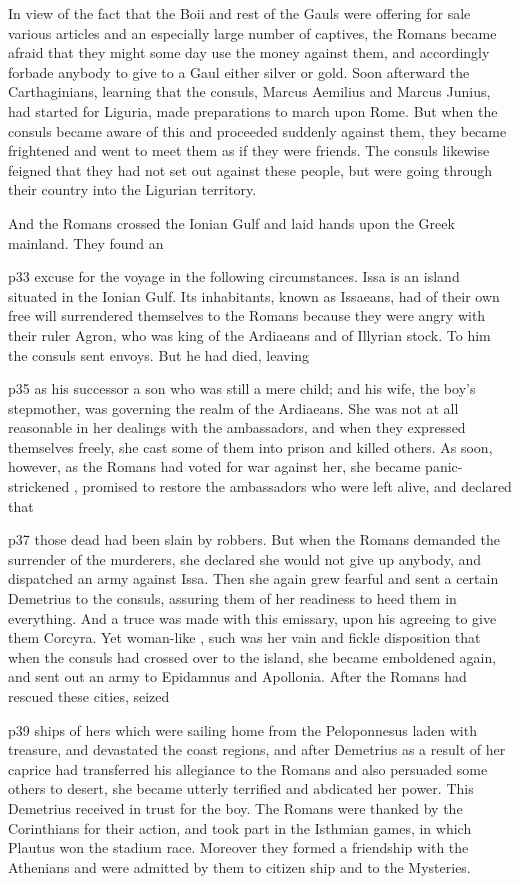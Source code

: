 In view of the fact that the Boii and rest of the Gauls were offering for sale various articles and an especially large number of captives, the Romans became afraid that they might some day use the money against them, and accordingly forbade anybody to give to a Gaul either silver or gold. Soon afterward the Carthaginians, learning that the consuls, Marcus Aemilius and Marcus Junius, had started for Liguria, made preparations to march upon Rome. But when the consuls became aware of this and proceeded suddenly against them, they became frightened and went to meet them as if they were friends. The consuls likewise feigned that they had not set out against these people, but were going through their country into the Ligurian territory.

And the Romans crossed the Ionian Gulf and laid hands upon the Greek mainland. They found an

p33 excuse for the voyage in the following circumstances. Issa is an island situated in the Ionian Gulf. Its inhabitants, known as Issaeans, had of their own free will surrendered themselves to the Romans because they were angry with their ruler Agron, who was king of the Ardiaeans and of Illyrian stock. To him the consuls sent envoys. But he had died, leaving

p35 as his successor a son who was still a mere child; and his wife, the boy's stepmother, was governing the realm of the Ardiaeans. She was not at all reasonable in her dealings with the ambassadors, and when they expressed themselves freely, she cast some of them into prison and killed others. As soon, however, as the Romans had voted for war against her, she became panic-strickened , promised to restore the ambassadors who were left alive, and declared that

p37 those dead had been slain by robbers. But when the Romans demanded the surrender of the murderers, she declared she would not give up anybody, and dispatched an army against Issa. Then she again grew fearful and sent a certain Demetrius to the consuls, assuring them of her readiness to heed them in everything. And a truce was made with this emissary, upon his agreeing to give them Corcyra. Yet woman-like , such was her vain and fickle disposition that when the consuls had crossed over to the island, she became emboldened again, and sent out an army to Epidamnus and Apollonia. After the Romans had rescued these cities, seized

p39 ships of hers which were sailing home from the Peloponnesus laden with treasure, and devastated the coast regions, and after Demetrius as a result of her caprice had transferred his allegiance to the Romans and also persuaded some others to desert, she became utterly terrified and abdicated her power. This Demetrius received in trust for the boy. The Romans were thanked by the Corinthians for their action, and took part in the Isthmian games, in which Plautus won the stadium race. Moreover they formed a friendship with the Athenians and were admitted by them to citizen ­ship and to the Mysteries.

